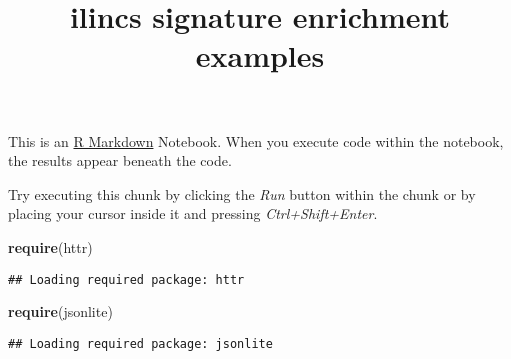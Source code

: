 \documentclass[]{article}
\title{ilincs signature enrichment examples}
\author{}
\date{}
\newenvironment{Shaded}{\begin{snugshade}}{\end{snugshade}}
\newcommand{\KeywordTok}[1]{\textcolor[rgb]{0.13,0.29,0.53}{\textbf{#1}}}
\newcommand{\NormalTok}[1]{#1}
\begin{document}
\maketitle

This is an \href{http://rmarkdown.rstudio.com}{R Markdown} Notebook.
When you execute code within the notebook, the results appear beneath
the code.

Try executing this chunk by clicking the \emph{Run} button within the
chunk or by placing your cursor inside it and pressing
\emph{Ctrl+Shift+Enter}.

\begin{Shaded}
\begin{Highlighting}[]
\KeywordTok{require}\NormalTok{(httr)}
\end{Highlighting}
\end{Shaded}

\begin{verbatim}
## Loading required package: httr
\end{verbatim}

\begin{Shaded}
\begin{Highlighting}[]
\KeywordTok{require}\NormalTok{(jsonlite)}
\end{Highlighting}
\end{Shaded}

\begin{verbatim}
## Loading required package: jsonlite
\end{verbatim}
\end{document}
